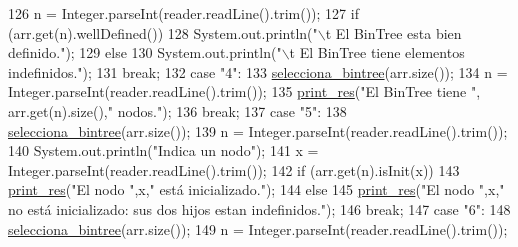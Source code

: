 \begin{DoxyCode}
126                         n = Integer.parseInt(reader.readLine().trim());
127                         \textcolor{keywordflow}{if} (arr.get(n).wellDefined())
128                             System.out.println(\textcolor{stringliteral}{"\(\backslash\)t El BinTree esta bien definido."});
129                         \textcolor{keywordflow}{else} 
130                             System.out.println(\textcolor{stringliteral}{"\(\backslash\)t El BinTree tiene elementos indefinidos."});
131                     \textcolor{keywordflow}{break};
132                     \textcolor{keywordflow}{case} \textcolor{stringliteral}{"4"}:
133                         \hyperlink{classdomini_1_1utils_1_1Driver____BinTree_a0d90bf2cb928174547e712140b5a4fe5}{selecciona\_bintree}(arr.size());
134                         n = Integer.parseInt(reader.readLine().trim());
135                         \hyperlink{classdomini_1_1utils_1_1Driver____BinTree_a434e26afb3eb701558d81b0fd1c29dcb}{print\_res}(\textcolor{stringliteral}{"El BinTree tiene "}, arr.get(n).size(),\textcolor{stringliteral}{" nodos."});
136                     \textcolor{keywordflow}{break};
137                     \textcolor{keywordflow}{case} \textcolor{stringliteral}{"5"}:
138                         \hyperlink{classdomini_1_1utils_1_1Driver____BinTree_a0d90bf2cb928174547e712140b5a4fe5}{selecciona\_bintree}(arr.size());
139                         n = Integer.parseInt(reader.readLine().trim());
140                         System.out.println(\textcolor{stringliteral}{"Indica un nodo"});
141                         x = Integer.parseInt(reader.readLine().trim());
142                         \textcolor{keywordflow}{if} (arr.get(n).isInit(x))
143                             \hyperlink{classdomini_1_1utils_1_1Driver____BinTree_a434e26afb3eb701558d81b0fd1c29dcb}{print\_res}(\textcolor{stringliteral}{"El nodo "},x,\textcolor{stringliteral}{" está inicializado."});
144                         \textcolor{keywordflow}{else} 
145                             \hyperlink{classdomini_1_1utils_1_1Driver____BinTree_a434e26afb3eb701558d81b0fd1c29dcb}{print\_res}(\textcolor{stringliteral}{"El nodo "},x,\textcolor{stringliteral}{" no está inicializado: sus dos hijos estan
       indefinidos."});
146                     \textcolor{keywordflow}{break};
147                     \textcolor{keywordflow}{case} \textcolor{stringliteral}{"6"}:
148                         \hyperlink{classdomini_1_1utils_1_1Driver____BinTree_a0d90bf2cb928174547e712140b5a4fe5}{selecciona\_bintree}(arr.size());
149                         n = Integer.parseInt(reader.readLine().trim());

\end{DoxyCode}
